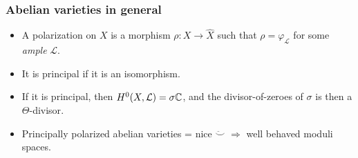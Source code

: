 \begin{frame}
\frametitle{Abelian varieties in general}

\begin{itemize}
	\item A \alert{polarization} on $X$ is a morphism $\rho: X \to \hat X$ such that $\rho=\varphi_\mathcal L$ for some \emph{ample} $\mathcal L$.
	\item It is \alert{principal} if it is an isomorphism. \pause
	\item If it is principal, then $H^0(X, \mathcal{L})=\sigma \mathbb{C}$, and the divisor-of-zeroes of $\sigma$ is then a \alert{$\Theta$-divisor}.
	\pause
	\item Principally polarized abelian varieties = nice \alert{$\ddot\smile$} $\Rightarrow$ well behaved moduli spaces.
\end{itemize}
\end{frame}